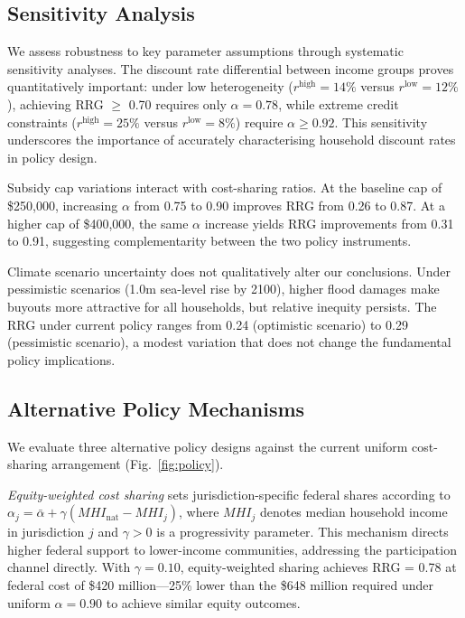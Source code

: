 \documentclass[12pt,a4paper]{article}
\begin{document}
\subsection{Sensitivity Analysis}

We assess robustness to key parameter assumptions through systematic sensitivity analyses. The discount rate differential between income groups proves quantitatively important: under low heterogeneity ($r^{\text{high}} = 14\%$ versus $r^{\text{low}} = 12\%$), achieving RRG $\geq$ 0.70 requires only $\alpha = 0.78$, while extreme credit constraints ($r^{\text{high}} = 25\%$ versus $r^{\text{low}} = 8\%$) require $\alpha \geq 0.92$. This sensitivity underscores the importance of accurately characterising household discount rates in policy design.

Subsidy cap variations interact with cost-sharing ratios. At the baseline cap of \$250,000, increasing $\alpha$ from 0.75 to 0.90 improves RRG from 0.26 to 0.87. At a higher cap of \$400,000, the same $\alpha$ increase yields RRG improvements from 0.31 to 0.91, suggesting complementarity between the two policy instruments.

Climate scenario uncertainty does not qualitatively alter our conclusions. Under pessimistic scenarios (1.0m sea-level rise by 2100), higher flood damages make buyouts more attractive for all households, but relative inequity persists. The RRG under current policy ranges from 0.24 (optimistic scenario) to 0.29 (pessimistic scenario), a modest variation that does not change the fundamental policy implications.

\subsection{Alternative Policy Mechanisms}

We evaluate three alternative policy designs against the current uniform cost-sharing arrangement (Fig.~\ref{fig:policy}).

\textit{Equity-weighted cost sharing} sets jurisdiction-specific federal shares according to $\alpha_j = \bar{\alpha} + \gamma(MHI_{\text{nat}} - MHI_j)$, where $MHI_j$ denotes median household income in jurisdiction $j$ and $\gamma > 0$ is a progressivity parameter. This mechanism directs higher federal support to lower-income communities, addressing the participation channel directly. With $\gamma = 0.10$, equity-weighted sharing achieves RRG = 0.78 at federal cost of \$420 million---25\% lower than the \$648 million required under uniform $\alpha = 0.90$ to achieve similar equity outcomes.
\end{document}
